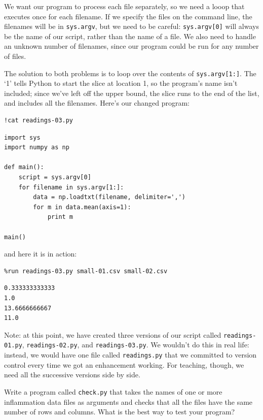 \documentclass{book}
\begin{document}
We want our program to process each file separately, so we need a looop
that executes once for each filename. If we specify the files on the
command line, the filenames will be in \texttt{sys.argv}, but we need to
be careful: \texttt{sys.argv{[}0{]}} will always be the name of our
script, rather than the name of a file. We also need to handle an
unknown number of filenames, since our program could be run for any
number of files.

The solution to both problems is to loop over the contents of
\texttt{sys.argv{[}1:{]}}. The `1' tells Python to start the slice at
location 1, so the program's name isn't included; since we've left off
the upper bound, the slice runs to the end of the list, and includes all
the filenames. Here's our changed program:

\begin{verbatim}
!cat readings-03.py
\end{verbatim}

\begin{verbatim}
import sys
import numpy as np

def main():
    script = sys.argv[0]
    for filename in sys.argv[1:]:
        data = np.loadtxt(filename, delimiter=',')
        for m in data.mean(axis=1):
            print m

main()
\end{verbatim}

and here it is in action:

\begin{verbatim}
%run readings-03.py small-01.csv small-02.csv
\end{verbatim}

\begin{verbatim}
0.333333333333
1.0
13.6666666667
11.0
\end{verbatim}

Note: at this point, we have created three versions of our script called
\texttt{readings-01.py}, \texttt{readings-02.py}, and
\texttt{readings-03.py}. We wouldn't do this in real life: instead, we
would have one file called \texttt{readings.py} that we committed to
version control every time we got an enhancement working. For teaching,
though, we need all the successive versions side by side.

\begin{challenge}
  Write a program called \texttt{check.py} that takes the names of one
  or more inflammation data files as arguments and checks that all the
  files have the same number of rows and columns. What is the best way
  to test your program?
\end{challenge}
\end{document}
